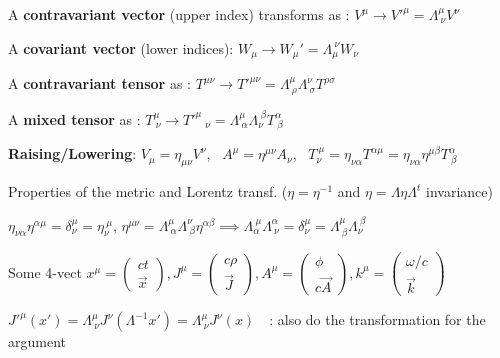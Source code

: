 \vspace{2cm}
\begin{squishlist}

\item A \textbf{contravariant vector} (upper index) transforms as : $V^\mu\rightarrow V'^{\mu} = \Lambda^{\mu}_{\ \nu} V^{\nu}$

\item A \textbf{covariant vector} (lower indices): $W_{\mu} \rightarrow W_{\mu}' = \Lambda_{\mu}^{\ \nu}W_\nu $

\item A \textbf{contravariant tensor} as : $T^{\mu \nu} \rightarrow T'^{\mu \nu} = \Lambda^{\mu}_{\ \rho} \Lambda^{\nu}_{\ \sigma} T^{\rho \sigma}$

\item A \textbf{mixed tensor} as : $T^\mu_{\ \nu} \rightarrow T'^\mu_{\quad \nu} = \Lambda^\mu_{\ \alpha}\Lambda_\nu^{\ \beta}T_{\ \beta}^\alpha $ 

\item \textbf{Raising/Lowering}: $V_\mu=\eta_{\mu\nu}V^\nu$, \ $A^{\mu} = \eta^{\mu\nu} A_{\nu}$, \ $T^{\ \mu}_\nu = \eta_{\nu\alpha}T^{\alpha\mu}=\eta_{\nu\alpha}\eta^{\mu\beta} T^\alpha_{\ \beta}$

\item Properties of the metric and Lorentz transf. ($\eta=\eta^{-1}$ and $\eta=\Lambda\eta\Lambda^t$ invariance)

$ \eta_{\nu\alpha}\eta^{\alpha\mu} = \delta_\nu^\mu = \eta_\nu^{\ \mu}$, \quad $\eta^{\mu\nu} = \Lambda^{\mu}_{\ \alpha}\Lambda^{\nu}_{\ \beta}\eta^{\alpha\beta} \implies \Lambda_\alpha^{\ \mu}\Lambda^\alpha_{\ \nu} = \delta^\mu_\nu = \Lambda^\mu_{\ \beta}\Lambda_{\nu}^{\ \beta} $


\item Some 4-vect $ x^{\mu} =
	\begin{pmatrix}
	ct\\
	\vec{x}
	\end{pmatrix}, J^{\mu} = \begin{pmatrix}
	c\rho\\
	\vec{J}
	\end{pmatrix}, A^{\mu} =
	\begin{pmatrix}
	\phi\\
	c\vec{A}
	\end{pmatrix}, k^\mu=
    \begin{pmatrix}
     \omega/c \\
     \Vec{k}
    \end{pmatrix}$
\item $J'^{\mu} (x') = \Lambda^{\mu}_{\ \nu} J^{\nu}(\Lambda^{-1}x') = \Lambda^{\mu}_{\ \nu} J^{\nu} (x) $ \,\, : also do the transformation for the argument



\end{squishlist}
